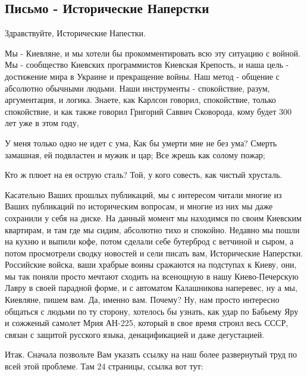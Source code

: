  
 
 
 
 

\subsection{Письмо - Исторические Наперстки}

Здравствуйте, Исторические Напестки.

Мы - Киевляне, и мы хотели бы прокомментировать всю эту ситуацию с войной.  Мы
- сообщество Киевских программистов Киевская Крепость, и наша цель - достижение
мира в Украине и прекращение войны.  Наш метод - общение с абсолютно обычными
людьми. Наши инструменты - спокойствие, разум, аргументация, и логика. Знаете,
как Карлсон говорил, спокойствие, только спокойствие, и как также говорил
Григорий Саввич Сковорода, кому будет 300 лет уже в этом году,

У меня только одно не идет с ума,
Как бы умерти мне не без ума?
Смерть замашная, ей подвластен и мужик и цар;
Все жрешь как солому пожар;

Кто ж плюет на ея острую сталь?
Той, у кого совесть, как чистый хрусталь.

Касательно Ваших прошлых публикаций, мы с интересом читали многие из Ваших
публикаций по историческим вопросам, и многие из них мы даже сохранили у себя
на диске. На данный момент мы находимся по своим Киевским квартирам, и там где
мы сидим, абсолютно тихо и спокойно. Недавно мы пошли на кухню и выпили кофе,
потом сделали себе бутерброд с ветчиной и сыром, а потом просмотрели сводку
новостей и сели писать вам, Исторические Наперстки. Российские войска, ваши
храбрые воины сражаются на подступах к Киеву, они, мы так поняли просто мечтают
сходить на всенощную в нашу Киево-Печерскую Лавру в своей парадной форме, и с
автоматом Калашникова наперевес, ну а мы, Киевляне, пишем вам. Да, именно вам.
Почему?  Ну, нам просто интересно общаться с людьми по ту сторону, хотелось бы
узнать, как удар по Бабьему Яру и сожженый самолет Мрия АН-225, который в свое
время строил весь СССР, связан с защитой русского языка, денацификацией и даже
дегустацией.

Итак. Сначала позвольте Вам указать ссылку на наш более развернутый труд по
всей этой проблеме. Там 24 страницы, ссылка вот тут:

